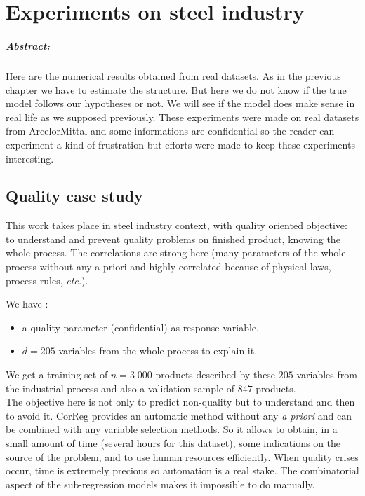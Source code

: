 \documentclass[12pt,a4paper]{report}
\begin{document}
\chapter{Experiments on steel industry} \label{sectionrealcase}
\paragraph{Abstract:} Here are the numerical results obtained from real datasets. As in the previous chapter we have to estimate the structure. 
But here we do not know if the true model follows our hypotheses or not. We will see if the model does make sense in real life as we supposed previously. 
These experiments were made on real datasets from ArcelorMittal and some informations are confidential so the reader can experiment a kind of frustration but efforts were made to keep these experiments interesting. 

	\section{Quality case study} \label{sectionexfos}
This work takes place in steel industry context, with quality oriented objective: to understand and prevent quality problems on finished product, knowing the whole process. The correlations are strong here (many parameters of the whole process without any a priori and highly correlated because of physical laws, process rules, {\it etc.}). 
		
We have :
		\begin{itemize}
			\item a quality parameter (confidential) as response variable,
			\item $d=205$ variables from the whole process to explain it.
		\end{itemize}
We get a training set of $n=3\;000$ products described by these $205$ variables from the industrial process and also a validation sample of $847$ products.\\

The objective here is not only to predict non-quality but to understand and then to avoid it. {\sc CorReg} provides an automatic method without any {\it a priori} and can be combined with any variable selection methods. So it allows to obtain, in a small amount of time (several hours for this dataset), some indications on the source of the problem, and to use human resources efficiently. When quality crises occur, time is extremely precious so automation is a real stake. The combinatorial aspect of the sub-regression models makes it impossible to do manually.\\
\end{document}
